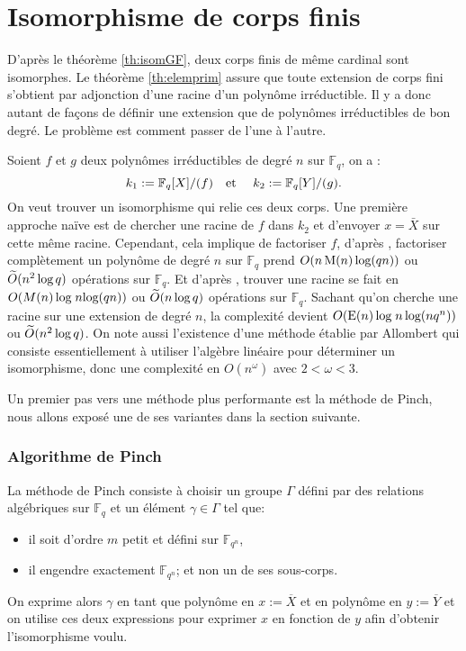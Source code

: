 \documentclass[a4paper]{article} %
\numberwithin{section}{part}
\numberwithin{equation}{section}
\newcommand\GF[1]{\mathbb{F}_{#1}}
\newcommand\etmath{\textup{\quad et \quad}}
\newcommand\M[1]{\textup{M}(#1)}
\newcommand\E[1]{\textup{E}(#1)}
\newcommand\tO[1]{\widetilde{O}(#1)}
\begin{document}
\part{Isomorphisme de corps finis}
\label{deux}
D'après le théorème \ref{th:isomGF}, deux corps finis de même cardinal sont
isomorphes. Le théorème \ref{th:elemprim} assure que toute extension de corps 
fini s'obtient par adjonction d'une racine d'un polynôme irréductible. Il y
a donc autant de façons de définir une extension que de polynômes 
irréductibles de bon degré. Le problème est comment passer de l'une à 
l'autre.\par
Soient $f$ et $g$ deux polynômes irréductibles de degré $n$ sur $\GF{q}$, on a :
\begin{equation}
k_1 := \GF{q}[X]/(f) \etmath k_2 := \GF{q}[Y]/(g). 
\end{equation}
On veut trouver un isomorphisme qui relie ces deux corps. Une première approche 
naïve est de chercher une racine de $f$ dans $k_2$ et d'envoyer $x = \bar{X}$ 
sur cette même racine. Cependant, cela implique de factoriser $f$, d'après 
\cite[th. 14.14]{GaGe}, factoriser complètement un polynôme de degré $n$ sur 
$\GF{q}$ prend $O(n\,\M{n}\,\textup{log}(qn))$ ou $\tO{n^2\,\textup{log\,}q}$
opérations sur $\GF{q}$. Et d'après \cite[cor. 14.16]{GaGe}, trouver une racine 
se fait en $O(M(n)\,\textup{log\;}n\textup{log}(qn))$ ou 
$\tO{n\,\textup{log\,}q}$ opérations sur $\GF{q}$. Sachant qu'on cherche une 
racine sur une extension de degré $n$, la complexité devient 
$O(\E{n}\,\textup{log\;}n\,\textup{log}(nq^n))$ ou $\tO{n^2\,\textup{log\,}q}$.
On note aussi l'existence d'une méthode établie par Allombert\cite{All} qui 
consiste essentiellement à utiliser l'algèbre linéaire pour déterminer un
isomorphisme, donc une complexité en $O(n^{\omega})$ avec $2<\omega<3$.\par
Un premier pas vers une méthode plus performante est la méthode de Pinch, 
nous allons exposé une de ses variantes dans la section suivante.

\section{Algorithme de Pinch}
La méthode de Pinch consiste à choisir un groupe $\Gamma$ défini par des 
relations algébriques sur $\GF{q}$ et un élément $\gamma\in\Gamma$ tel que:
\vspace{0.3cm}
\begin{itemize}
\item il soit d'ordre $m$ petit et défini sur $\GF{q^n}$,
\item il engendre exactement $\GF{q^n}$; et non un de ses sous-corps.
\end{itemize}
\vspace{0.3cm}
On exprime alors $\gamma$ en tant que polynôme en $x := \overline{X}$ et en 
polynôme en $y := \overline{Y}$ et on utilise ces deux expressions pour exprimer
$x$ en fonction de $y$ afin d'obtenir l'isomorphisme voulu.\par
\end{document}
